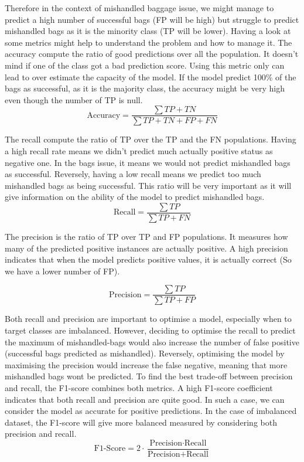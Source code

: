 \documentclass[12pt]{article}
\begin{document}
Therefore in the context of mishandled baggage issue, we might manage to predict a high number of successful bags (FP will be high) but struggle to predict mishandled bags as it is the minority class (TP will be lower). 
Having a look at some metrics might help to understand the problem and how to manage it.
The accuracy compute the ratio of good predictions over all the population. It doesn't mind if one of the class got a bad prediction score. Using this metric only can lead to over estimate the capacity of the model. If the model predict 100\% of the bags as successful, as it is the majority class, the accuracy might be very high even though the number of TP is null. 
\begin{equation}
\text{Accuracy} = \frac{\sum{TP + TN}}{\sum{TP + TN + FP + FN}}    
\end{equation}

The recall compute the ratio of TP over the TP and the FN populations. Having a high recall rate means we didn't predict much actually positive status as negative one. In the bags issue, it means we would not predict mishandled bags as successful. Reversely, having a low recall means we predict too much mishandled bags as being successful. This ratio will be very important as it will give information on the ability of the model to predict mishandled bags.
\begin{equation}\label{equation:Recall}
\text{Recall} = \frac{\sum{TP}}{\sum{TP + FN}}    
\end{equation}

The precision is the ratio of TP over TP and FP populations. It measures how many of the predicted positive instances are actually positive. A high precision indicates that when the model predicts positive values, it is actually correct (So we have a lower number of FP).

\begin{equation}\label{equation:Precision}
\text{Precision} = \frac{\sum{TP}}{\sum{TP + FP}}
\end{equation}

\noindent Both recall and precision are important to optimise a model, especially when to target classes are imbalanced. However, deciding to optimise the recall to predict the maximum of mishandled-bags would also increase the number of false positive (successful bags predicted as mishandled). Reversely, optimising the model by maximising the precision would increase the false negative, meaning that more mishandled bags wont be predicted. 
To find the best trade-off between precision and recall, the F1-score combines both metrics. A high F1-score coefficient indicates that both recall and precision are quite good. In such a case, we can consider the model as accurate for positive predictions. In the case of imbalanced dataset, the F1-score will give more balanced measured by considering both precision and recall. 
\begin{equation}\label{equation:F1-score}
\text{F1-Score} = 2 \cdot \frac{\text{Precision} \cdot \text{Recall}}{\text{Precision} + \text{Recall}}    
\end{equation}
\end{document}
